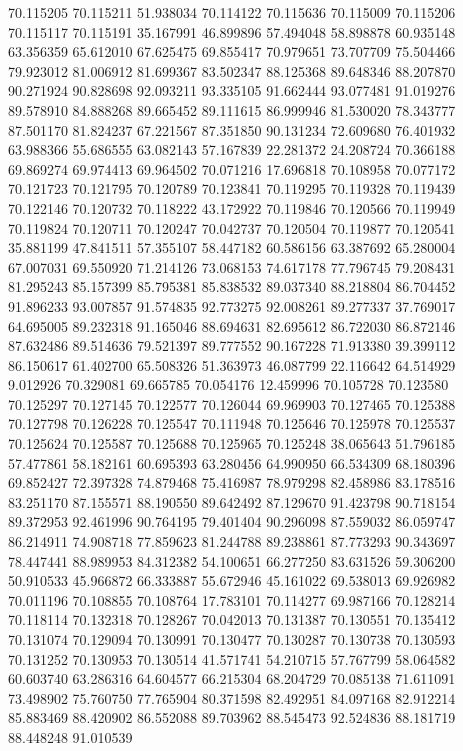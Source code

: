 70.115205
70.115211
51.938034
70.114122
70.115636
70.115009
70.115206
70.115117
70.115191
35.167991
46.899896
57.494048
58.898878
60.935148
63.356359
65.612010
67.625475
69.855417
70.979651
73.707709
75.504466
79.923012
81.006912
81.699367
83.502347
88.125368
89.648346
88.207870
90.271924
90.828698
92.093211
93.335105
91.662444
93.077481
91.019276
89.578910
84.888268
89.665452
89.111615
86.999946
81.530020
78.343777
87.501170
81.824237
67.221567
87.351850
90.131234
72.609680
76.401932
63.988366
55.686555
63.082143
57.167839
22.281372
24.208724
70.366188
69.869274
69.974413
69.964502
70.071216
17.696818
70.108958
70.077172
70.121723
70.121795
70.120789
70.123841
70.119295
70.119328
70.119439
70.122146
70.120732
70.118222
43.172922
70.119846
70.120566
70.119949
70.119824
70.120711
70.120247
70.042737
70.120504
70.119877
70.120541
35.881199
47.841511
57.355107
58.447182
60.586156
63.387692
65.280004
67.007031
69.550920
71.214126
73.068153
74.617178
77.796745
79.208431
81.295243
85.157399
85.795381
85.838532
89.037340
88.218804
86.704452
91.896233
93.007857
91.574835
92.773275
92.008261
89.277337
37.769017
64.695005
89.232318
91.165046
88.694631
82.695612
86.722030
86.872146
87.632486
89.514636
79.521397
89.777552
90.167228
71.913380
39.399112
86.150617
61.402700
65.508326
51.363973
46.087799
22.116642
64.514929
9.012926
70.329081
69.665785
70.054176
12.459996
70.105728
70.123580
70.125297
70.127145
70.122577
70.126044
69.969903
70.127465
70.125388
70.127798
70.126228
70.125547
70.111948
70.125646
70.125978
70.125537
70.125624
70.125587
70.125688
70.125965
70.125248
38.065643
51.796185
57.477861
58.182161
60.695393
63.280456
64.990950
66.534309
68.180396
69.852427
72.397328
74.879468
75.416987
78.979298
82.458986
83.178516
83.251170
87.155571
88.190550
89.642492
87.129670
91.423798
90.718154
89.372953
92.461996
90.764195
79.401404
90.296098
87.559032
86.059747
86.214911
74.908718
77.859623
81.244788
89.238861
87.773293
90.343697
78.447441
88.989953
84.312382
54.100651
66.277250
83.631526
59.306200
50.910533
45.966872
66.333887
55.672946
45.161022
69.538013
69.926982
70.011196
70.108855
70.108764
17.783101
70.114277
69.987166
70.128214
70.118114
70.132318
70.128267
70.042013
70.131387
70.130551
70.135412
70.131074
70.129094
70.130991
70.130477
70.130287
70.130738
70.130593
70.131252
70.130953
70.130514
41.571741
54.210715
57.767799
58.064582
60.603740
63.286316
64.604577
66.215304
68.204729
70.085138
71.611091
73.498902
75.760750
77.765904
80.371598
82.492951
84.097168
82.912214
85.883469
88.420902
86.552088
89.703962
88.545473
92.524836
88.181719
88.448248
91.010539
